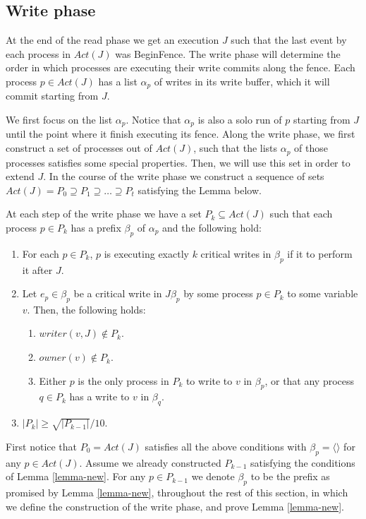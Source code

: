 \subsection{Write phase}
At the end of the read phase we get an execution $J$ such that the last event by each process in $Act(J)$ was BeginFence. The write phase will determine the order in which processes are executing their write commits along the fence. Each process $p \in Act(J)$ has a list $\alpha_p$ of writes in its write buffer, which it will commit starting from $J$.

We first focus on the list $\alpha_p$. Notice that $\alpha_p$ is also a solo run of $p$ starting from $J$ until the point where it finish executing its fence. Along the write phase, we first construct a set of processes out of $Act(J)$, such that the lists $\alpha_p$ of those processes satisfies some special properties. Then, we will use this set in order to extend $J$.
In the course of the write phase we construct a sequence of sets $Act(J) = P_0 \supseteq P_1 \supseteq \ldots \supseteq P_t$ satisfying the Lemma below.

\begin{lemma} \label{lemma-new}
	At each step of the write phase we have a set $P_k \subseteq Act(J)$ such that each process $p \in P_k$ has a prefix $\beta_p$ of $\alpha_p$ and the following hold:
	\begin{enumerate}[(1)]
		\item For each $p \in P_k$, $p$ is executing exactly $k$ critical writes in $\beta_p$ if it to perform it after $J$.
		\item Let $e_p \in \beta_p$ be a critical write in $J \beta_p$ by some process $p \in P_k$ to some variable $v$. Then, the following holds:
		\begin{enumerate}
			\item $writer(v,J) \notin P_k$.
			\item $owner(v) \notin P_k$.
			\item Either $p$ is the only process in $P_k$ to write to $v$ in $\beta_p$, or that any process $q \in P_k$ has a write to $v$ in $\beta_q$.
		\end{enumerate}
		\item $|P_k| \geq \sqrt{|P_{k-1}|}/10$.
	\end{enumerate}
\end{lemma}

First notice that $P_0=Act(J)$ satisfies all the above conditions with $\beta_p=\langle \rangle$ for any $p \in Act(J)$. Assume we already constructed $P_{k-1}$ satisfying the conditions of Lemma \ref{lemma-new}. For any $p \in P_{k-1}$ we denote $\beta_p$ to be the prefix as promised by Lemma \ref{lemma-new}, throughout the rest of this section, in which we define the construction of the write phase, and prove Lemma \ref{lemma-new}.

